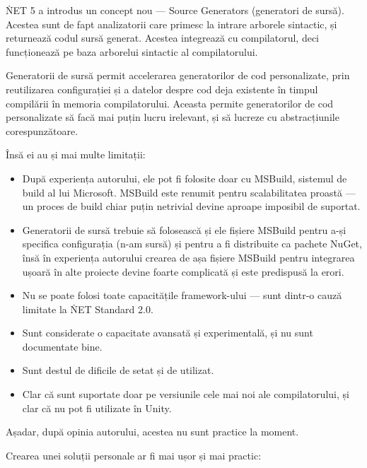\documentclass{report}
\begin{document}
\. NET 5 a introdus un concept nou --- Source Generators (generatori de sursă)\cite{source_generators}.
Acestea sunt de fapt analizatorii care primesc la intrare arborele sintactic, și returnează codul sursă generat.
Acestea integrează cu compilatorul, deci funcționează pe baza arborelui sintactic al compilatorului.

Generatorii de sursă permit accelerarea generatorilor de cod personalizate, prin reutilizarea configurației și a datelor despre cod deja existente în timpul compilării în memoria compilatorului.
Aceasta permite generatorilor de cod personalizate să facă mai puțin lucru irelevant, și să lucreze cu abstracțiunile corespunzătoare.

Însă ei au și mai multe limitații:

\begin{itemize}

  \item După experiența autorului, ele pot fi folosite doar cu MSBuild, sistemul de build al lui Microsoft.
  MSBuild este renumit pentru scalabilitatea proastă --- un proces de build chiar puțin netrivial devine aproape imposibil de suportat.

  \item Generatorii de sursă trebuie să folosească și ele fișiere MSBuild pentru a-și specifica configurația (n-am sursă) și pentru a fi distribuite ca pachete NuGet, 
    însă în experiența autorului crearea de așa fișiere MSBuild pentru integrarea ușoară în alte proiecte devine foarte complicată și este predispusă la erori.

  \item Nu se poate folosi toate capacitățile framework-ului --- sunt dintr-o cauză limitate la \. NET Standard 2.0.

  \item Sunt considerate o capacitate avansată și experimentală, și nu sunt documentate bine.

  \item Sunt destul de dificile de setat și de utilizat.
    
  \item Clar că sunt suportate doar pe versiunile cele mai noi ale compilatorului, și clar că nu pot fi utilizate în Unity.

\end{itemize}

Așadar, după opinia autorului, acestea nu sunt practice la moment.

Crearea unei soluții personale ar fi mai ușor și mai practic:
\end{document}
